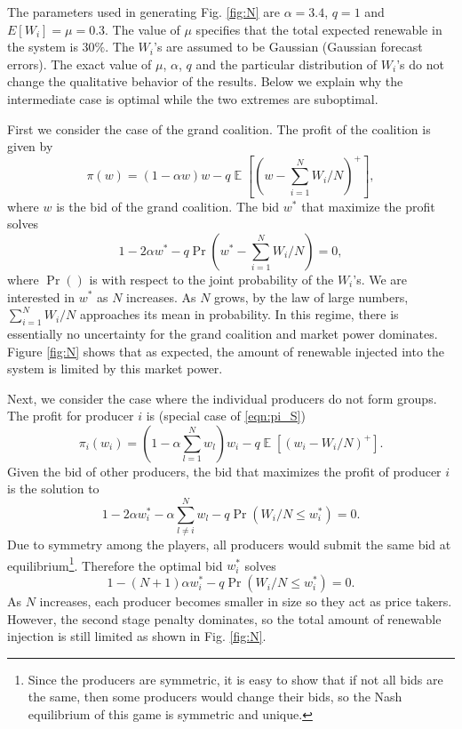 \documentclass[journal]{IEEEtran}
\begin{document}
The parameters used in generating Fig. \ref{fig:N} are $\alpha=3.4$, $q=1$ and $E[W_i]=\mu=0.3$. The value of $\mu$ specifies that the total expected renewable in the system is $30\%$. The $W_i$'s are assumed to be Gaussian (Gaussian forecast errors).  The exact value of $\mu$, $\alpha$, $q$ and the particular distribution of $W_i$'s do not change the qualitative behavior of the results. Below we explain why the intermediate case is optimal while the two extremes are suboptimal.  
  

First we consider the case of the grand coalition. The profit of the coalition is given by
\begin{equation}
\pi(w)= (1-\alpha w) w- q \operatorname{\mathbb{E}}\left[\left(w-\sum_{i=1}^N W_i/N\right)^+\right],
\end{equation}
where $w$ is the bid of the grand coalition. 
The bid $w^*$ that maximize the profit solves 
\begin{equation*}
1-2 \alpha w^* -q \Pr\left(w^* - \sum_{i=1}^N W_i/N\right)=0,
\end{equation*}
where $\Pr()$ is with respect to the joint probability of the $W_i$'s. We are interested in $w^*$ as $N$ increases. As $N$ grows, by the law of large numbers, $\sum_{i=1}^N W_i/N$ approaches its mean in probability. In this regime, there is essentially no uncertainty for the grand coalition and market power dominates. Figure \ref{fig:N} shows that as expected, the amount of renewable injected into the system is limited by this market power.  

Next, we consider the case where the individual producers do not form groups. The profit for producer $i$ is (special case of \eqref{eqn:pi_S})
\begin{equation} \label{eqn:pi_i} 
\pi_i (w_i)= \left(1- \alpha \sum_{l=1}^N w_l\right) w_i - q\operatorname{\mathbb{E}}[(w_i-W_i/N)^+].
\end{equation}
Given the bid of other producers, the bid that maximizes the profit of producer $i$ is the solution to
\begin{equation}
1-2 \alpha w_i^* - \alpha \sum_{l \neq i}^N w_l - q \Pr(W_i/N \leq w_i^*)=0.
\end{equation}
Due to symmetry among the players, all producers would submit the same bid at equilibrium\footnote{Since the producers are symmetric, it is easy to show that if not all bids are the same, then some producers would change their bids, so the Nash equilibrium of this game is symmetric and unique.}. Therefore the optimal bid $w_i^*$ solves
\begin{equation*}
1-(N+1) \alpha w_i^*-q\Pr(W_i/N \leq w_i^*)=0.
\end{equation*}
As $N$ increases, each producer becomes smaller in size so they act as price takers. However, the second stage penalty dominates, so the total amount of renewable injection is still limited as shown in Fig. \ref{fig:N}. 
\end{document}
